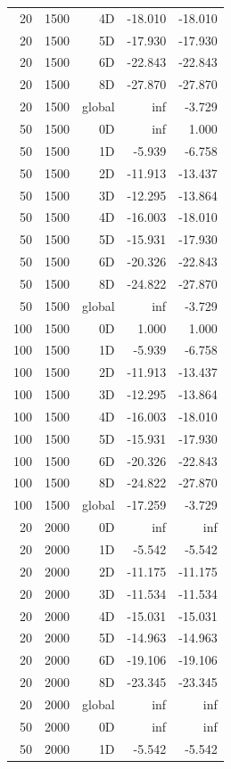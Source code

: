 \begin{longtable}{rrrrr}
20 & 1500 & 4D & -18.010 & -18.010 \\
20 & 1500 & 5D & -17.930 & -17.930 \\
20 & 1500 & 6D & -22.843 & -22.843 \\
20 & 1500 & 8D & -27.870 & -27.870 \\
20 & 1500 & global & inf & -3.729 \\
50 & 1500 & 0D & inf & 1.000 \\
50 & 1500 & 1D & -5.939 & -6.758 \\
50 & 1500 & 2D & -11.913 & -13.437 \\
50 & 1500 & 3D & -12.295 & -13.864 \\
50 & 1500 & 4D & -16.003 & -18.010 \\
50 & 1500 & 5D & -15.931 & -17.930 \\
50 & 1500 & 6D & -20.326 & -22.843 \\
50 & 1500 & 8D & -24.822 & -27.870 \\
50 & 1500 & global & inf & -3.729 \\
100 & 1500 & 0D & 1.000 & 1.000 \\
100 & 1500 & 1D & -5.939 & -6.758 \\
100 & 1500 & 2D & -11.913 & -13.437 \\
100 & 1500 & 3D & -12.295 & -13.864 \\
100 & 1500 & 4D & -16.003 & -18.010 \\
100 & 1500 & 5D & -15.931 & -17.930 \\
100 & 1500 & 6D & -20.326 & -22.843 \\
100 & 1500 & 8D & -24.822 & -27.870 \\
100 & 1500 & global & -17.259 & -3.729 \\
20 & 2000 & 0D & inf & inf \\
20 & 2000 & 1D & -5.542 & -5.542 \\
20 & 2000 & 2D & -11.175 & -11.175 \\
20 & 2000 & 3D & -11.534 & -11.534 \\
20 & 2000 & 4D & -15.031 & -15.031 \\
20 & 2000 & 5D & -14.963 & -14.963 \\
20 & 2000 & 6D & -19.106 & -19.106 \\
20 & 2000 & 8D & -23.345 & -23.345 \\
20 & 2000 & global & inf & inf \\
50 & 2000 & 0D & inf & inf \\
50 & 2000 & 1D & -5.542 & -5.542 \\

\end{longtable}
